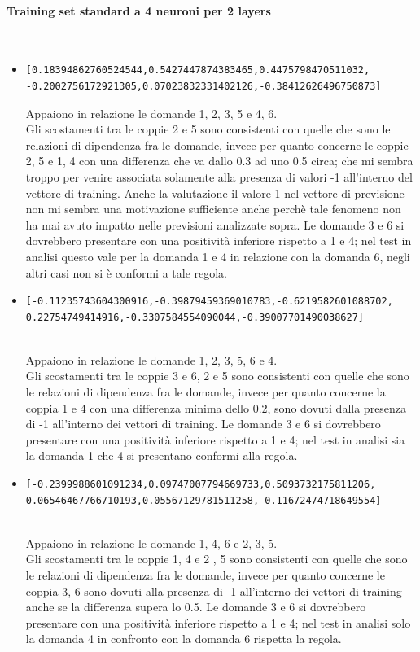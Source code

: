 \documentclass[11pt,a4paper,italian]{article}
\begin{document}
\paragraph{Training set standard a 4 neuroni per 2 layers}\mbox{}
\label{Training set standard su rete a 4 neuroni}
\\
\noindent
\begin{itemize}
\item \begin{verbatim}[0.18394862760524544,0.5427447874383465,0.4475798470511032,
-0.2002756172921305,0.07023832331402126,-0.38412626496750873] \end{verbatim}
Appaiono in relazione le domande 1, 2, 3, 5 e 4, 6.\\
Gli scostamenti tra le coppie 2 e 5 sono consistenti con quelle che sono le relazioni  di dipendenza fra le domande, invece per quanto concerne le coppie 2, 5 e 1, 4 con una differenza che va dallo 0.3 ad uno 0.5 circa; che mi sembra troppo per venire associata solamente alla presenza di valori -1 all'interno del vettore di training. Anche la valutazione il valore 1 nel vettore di previsione non mi sembra una motivazione sufficiente anche perch\`e tale fenomeno non ha mai avuto impatto nelle previsioni analizzate sopra.
Le domande 3 e 6 si dovrebbero presentare con una positivit\`a inferiore rispetto a 1 e 4; nel test in analisi questo vale per la domanda 1 e 4 in relazione con la domanda 6, negli altri casi non si \`e conformi a tale regola.

\item \begin{verbatim}[-0.11235743604300916,-0.39879459369010783,-0.6219582601088702,
0.22754749414916,-0.3307584554090044,-0.39007701490038627] \end{verbatim}\\
Appaiono in relazione le domande 1, 2, 3, 5, 6 e 4.\\
Gli scostamenti tra le coppie 3 e 6, 2 e 5 sono consistenti con quelle che sono le relazioni di dipendenza fra le domande, invece per quanto concerne la coppia 1 e 4 con una differenza minima dello 0.2, sono dovuti dalla presenza di -1  all'interno dei vettori di training.
Le domande 3 e 6 si dovrebbero presentare con una positivit\`a inferiore rispetto a 1 e 4; nel test in analisi sia la domanda 1 che 4 si presentano conformi alla regola.

\item \begin{verbatim}[-0.2399988601091234,0.09747007794669733,0.5093732175811206,
0.06546467766710193,0.05567129781511258,-0.11672474718649554]\end{verbatim}\\
Appaiono in relazione le domande 1, 4, 6 e 2, 3, 5.\\
Gli scostamenti tra le  coppie 1, 4 e 2 , 5 sono consistenti con quelle che sono le relazioni di dipendenza fra le domande, invece per quanto concerne le coppia 3, 6 sono dovuti alla presenza di -1 all'interno dei vettori di training anche se la differenza supera lo 0.5.
Le domande 3 e 6 si dovrebbero presentare con una positivit\`a inferiore rispetto a 1 e 4; nel test in analisi solo la domanda 4 in confronto con la domanda 6 rispetta la regola.


\end{itemize}
\end{document}
